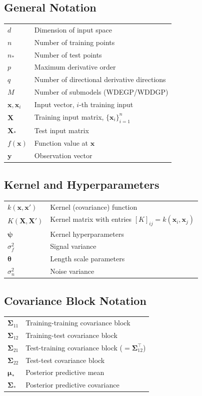 \documentclass[12pt]{article}
\begin{document}
	\subsection*{General Notation}
	\begin{tabular}{@{}l l@{}}
		$d$ & Dimension of input space \\
		$n$ & Number of training points \\
		$n_*$ & Number of test points \\
		$p$ & Maximum derivative order \\
		$q$ & Number of directional derivative directions \\
		$M$ & Number of submodels (WDEGP/WDDGP) \\
		$\mathbf{x}, \mathbf{x}_i$ & Input vector, $i$-th training input \\
		$\mathbf{X}$ & Training input matrix, $\{\mathbf{x}_i\}_{i=1}^{n}$ \\
		$\mathbf{X}_*$ & Test input matrix \\
		$f(\mathbf{x})$ & Function value at $\mathbf{x}$ \\
		$\mathbf{y}$ & Observation vector \\
	\end{tabular}
	
	\subsection*{Kernel and Hyperparameters}
	\begin{tabular}{@{}l l@{}}
		$k(\mathbf{x}, \mathbf{x}')$ & Kernel (covariance) function \\
		$K(\mathbf{X}, \mathbf{X}')$ & Kernel matrix with entries $[K]_{ij} = k(\mathbf{x}_i, \mathbf{x}_j)$ \\
		$\boldsymbol{\psi}$ & Kernel hyperparameters \\
		$\sigma_f^2$ & Signal variance \\
		$\boldsymbol{\theta}$ & Length scale parameters \\
		$\sigma_n^2$ & Noise variance \\
	\end{tabular}
	
	\subsection*{Covariance Block Notation}
	\begin{tabular}{@{}l l@{}}
		$\boldsymbol{\Sigma}_{11}$ & Training-training covariance block \\
		$\boldsymbol{\Sigma}_{12}$ & Training-test covariance block \\
		$\boldsymbol{\Sigma}_{21}$ & Test-training covariance block ($= \boldsymbol{\Sigma}_{12}^\top$) \\
		$\boldsymbol{\Sigma}_{22}$ & Test-test covariance block \\
		$\boldsymbol{\mu}_*$ & Posterior predictive mean \\
		$\boldsymbol{\Sigma}_*$ & Posterior predictive covariance \\
	\end{tabular}
	
\end{document}

